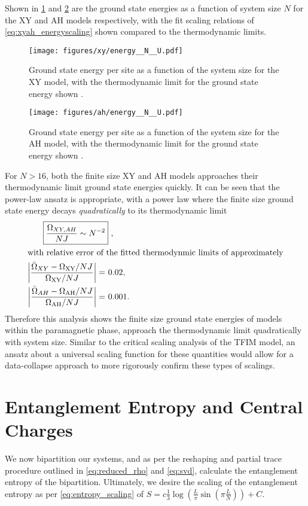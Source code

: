 \documentclass[12pt]{article}{}
\begin{document}
Shown in \cref{fig:xy_energy_N} and \cref{fig:ah_energy_N} are the ground state energies as a function of system size $N$ for the XY and AH models respectively, with the fit scaling relations of \cref{eq:xyah_energyscaling} shown compared to the thermodynamic limits.
\begin{figure}[H]
  \centering
  \texttt{[image: figures/xy/energy\_\_N\_\_U.pdf]}
  \caption{Ground state energy per site as a function of the system size for the XY model, with the thermodynamic limit for the ground state energy shown \cite{Lieb1961}.}
  \label{fig:xy_energy_N}
\end{figure}
\begin{figure}[H]
  \centering
  \texttt{[image: figures/ah/energy\_\_N\_\_U.pdf]}
  \caption{Ground state energy per site as a function of the system size for the AH model, with the thermodynamic limit for the ground state energy shown \cite{Lieb1961}.}
  \label{fig:ah_energy_N}
\end{figure}

For $N>16$, both the finite size XY and AH models approaches their thermodynamic limit ground state energies quickly. It can be seen that the power-law ansatz is appropriate, with a power law where the finite size ground state energy decays \emph{quadratically} to its thermodynamic limit
\begin{align}
  \Aboxed{\frac{\Omega_{XY,AH}}{NJ} \sim N^{-2}}~, \label{eq:xyah_energyscaling_fit} \\
  \intertext{with relative error of the fitted thermodynmic limits of approximately}
  \abs{\frac{\bar{\Omega}_{XY} - \Omega_{\textrm{XY}}/{NJ}}{\Omega_{\textrm{XY}}/{NJ}}} =&~ 0.02, \\
  \abs{\frac{\bar{\Omega}_{AH} - \Omega_{\textrm{AH}}/{NJ}}{\Omega_{\textrm{AH}}/{NJ}}} =&~ 0.001.
\end{align}
Therefore this analysis shows the finite size ground state energies of models within the paramagnetic phase, approach the thermodynamic limit quadratically with system size. Similar to the critical scaling analysis of the TFIM model, an ansatz about a universal scaling function for these quantities would allow for a data-collapse approach to more rigorously confirm these types of scalings.

\newpage
\section{Entanglement Entropy and Central Charges}
We now bipartition our systems, and as per the reshaping and partial trace procedure outlined in \cref{eq:reduced_rho} and \cref{eq:svd}, calculate the entanglement entropy of the bipartition. Ultimately, we desire the scaling of the entanglement entropy as per \cref{eq:entropy_scaling} of $S = c \frac{1}{3}\log{\left(\frac{L}{\pi} \sin{(\pi \frac{L}{N})}\right)} + C$. 
\end{document}
